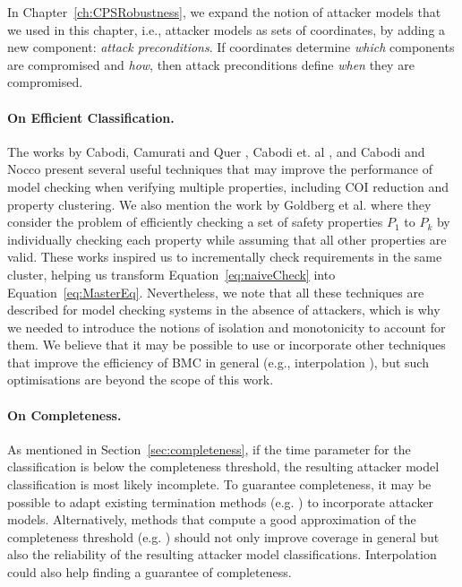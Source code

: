 In Chapter~\ref{ch:CPSRobustness}, we expand the notion of attacker models that we used in this chapter, i.e., attacker models as sets of coordinates, by adding a new component: \emph{attack preconditions}. If coordinates determine \emph{which} components are compromised and \emph{how}, then attack preconditions define \emph{when} they are compromised.

\paragraph{On Efficient Classification.} 
The works by Cabodi, Camurati and Quer \cite{GraphLabelingForEfficientCOIComputation}, Cabodi et. al \cite{ToSplitOrToGroup}, and Cabodi and Nocco \cite{OptimizedModelCheckingOfMultipleProperties} present several useful techniques that may improve the performance of model checking when verifying multiple properties, including COI reduction and property clustering. We also mention the work by Goldberg et al. \cite{JustAssume} where they consider the problem of efficiently checking a set of safety properties $P_1$ to $P_k$ by individually checking each property while assuming that all other properties are valid. These works inspired us to incrementally check requirements in the same cluster, helping us transform Equation~\ref{eq:naiveCheck} into Equation~\ref{eq:MasterEq}. Nevertheless, we note that all these techniques are described for model checking systems in the absence of attackers, which is why we needed to introduce the notions of isolation and monotonicity to account for them. We believe that it may be possible to use or incorporate other techniques that improve the efficiency of BMC in general (e.g., interpolation \cite{Interpolation}), but such optimisations are beyond the scope of this work.

\paragraph{On Completeness.} As mentioned in Section~\ref{sec:completeness}, if the time parameter for the classification is below the {completeness threshold}, the resulting attacker model classification is most likely {incomplete}. To guarantee completeness, it may be possible to adapt existing termination methods (e.g. \cite{ProvingMorePropertiesWithBMC}) to incorporate attacker models. Alternatively, methods that compute a good approximation of the completeness threshold (e.g. \cite{EfficientComputationOfRecurrenceDiameters}) should not only improve coverage in general but also the reliability of the resulting attacker model classifications.  Interpolation \cite{Interpolation} could also help finding a guarantee of completeness. 

